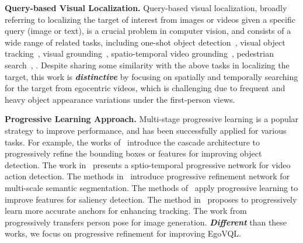 \vspace{0.5em}
\noindent
\textbf{Query-based Visual Localization.} Query-based visual localization, broadly referring to localizing the target of interest from images or videos given a specific query (image or text), is a crucial problem in computer 
vision, and consists of a wide range of related tasks, including one-shot object detection~\cite{hsieh2019one,yang2022balanced,zhao2022semantic}, visual object tracking~\cite{chen2023seqtrack,lin2025tracking,bertinetto2016fully}, visual grounding~\cite{deng2021transvg,liu2025grounding,zhu2022seqtr}, spatio-temporal video grounding~\cite{yang2022tubedetr,gu2024context}, pedestrian search~\cite{li2017person,yu2022cascade}, \etc. Despite sharing some similarity with the above tasks in localizing the target, this work is \textbf{\emph{distinctive}} by focusing on spatially and temporally searching for the target from egocentric videos, which is challenging due to frequent and heavy object appearance variations under the first-person views.

\vspace{0.5em}
\noindent
\textbf{Progressive Learning Approach.} Multi-stage progressive learning is a popular strategy to improve performance, and has been successfully applied for various tasks. For example, the works of~\cite{cai2018cascade,ye2023cascade,vu2019cascade} introduce the cascade architecture to progressively refine the bounding boxes or features for improving object detection. The work in~\cite{yang2019step} presents a sptio-temporal progressive network for video action detection. The methods in~\cite{huynh2021progressive,zhao2018icnet} introduce progressive refinement network for multi-scale semantic segmentation. The methods of~\cite{zhang2018progressive,chen2020progressively} apply progressive learning to improve features for saliency detection. The method in~\cite{fan2019siamese} proposes to progressively learn more accurate anchors for enhancing tracking. The work from~\cite{zhu2019progressive} progressively transfers person pose for image generation. \textbf{\emph{Different}} than these works, we focus on progressive refinement for improving EgoVQL.